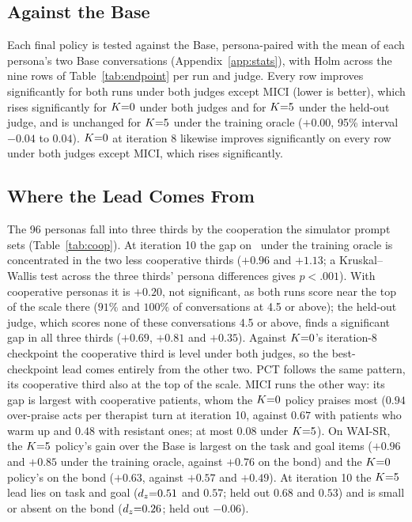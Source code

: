 \subsection{Against the Base}
\label{app:vsbase}

Each final policy is tested against the Base, persona-paired with the mean of each persona's two
Base conversations (Appendix~\ref{app:stats}), with Holm across the nine rows of
Table~\ref{tab:endpoint} per run and judge. Every row improves significantly for both runs under
both judges except MICI (lower is better), which rises significantly for $K{=}0$ under both judges and for $K{=}5$
under the held-out judge, and is unchanged for $K{=}5$ under the training oracle ($+0.00$, 95\%
interval $-0.04$ to $0.04$). $K{=}0$ at iteration 8 likewise improves significantly on every row
under both judges except MICI, which rises significantly.

\subsection{Where the Lead Comes From}
\label{app:cooperation}

The 96 personas fall into three thirds by the cooperation the
simulator prompt sets (Table~\ref{tab:coop}). At iteration 10 the gap on \QQ\ under the training
oracle is concentrated in the two less cooperative thirds ($+0.96$ and $+1.13$; a Kruskal--Wallis
test across the three thirds' persona differences gives $p<.001$). With cooperative personas it is
$+0.20$, not significant, as both runs score near the top of the scale there ($91\%$ and $100\%$ of
conversations at 4.5 or above); the held-out judge, which scores none of these conversations 4.5
or above, finds a significant gap in all three thirds ($+0.69$, $+0.81$ and $+0.35$). Against
$K{=}0$'s iteration-8 checkpoint the
cooperative third is level under both judges, so the best-checkpoint lead comes entirely from the
other two. PCT follows the same pattern, its cooperative third also at the top of the scale. MICI
runs the other way: its gap is largest with
cooperative patients, whom the $K{=}0$ policy praises most ($0.94$ over-praise acts per therapist turn
at iteration 10, against $0.67$ with patients who warm up and $0.48$ with resistant ones; at most
$0.08$ under $K{=}5$). On WAI-SR, the
$K{=}5$ policy's gain over the Base is largest on the task and goal items ($+0.96$ and $+0.85$ under
the training oracle, against $+0.76$ on the bond) and the $K{=}0$ policy's on the bond ($+0.63$,
against $+0.57$ and $+0.49$). At iteration 10 the $K{=}5$ lead lies on task and goal ($d_z{=}0.51$ and
$0.57$; held out $0.68$ and $0.53$) and is small or absent on the bond ($d_z{=}0.26$; held out
$-0.06$).

